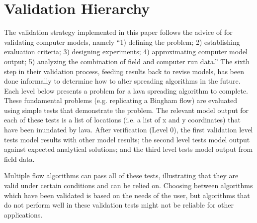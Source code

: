 			
			
			

	\section{Validation Hierarchy}\label{sec_validationb}
	
	The validation strategy implemented in this paper follows the advice of \citet{bayarri2007framework} for validating computer models, namely ``1) defining the problem; 2) establishing evaluation criteria; 3) designing experiments; 4) approximating computer model output; 5) analyzing the combination of field and computer run data.'' The sixth step in their validation process, feeding results back to revise models, has been done informally to determine how to alter spreading algorithms in the future. Each level below presents a problem for a lava spreading algorithm to complete. These fundamental problems (e.g. replicating a Bingham flow) are evaluated using simple tests that demonstrate the problem. The relevant model output for each of these tests is a list of locations (i.e. a list of x and y coordinates) that have been inundated by lava. After verification (Level 0), the first validation level tests model results with other model results; the second level tests model output against expected analytical solutions; and the third level tests model output from field data. 
	
	Multiple flow algorithms can pass all of these tests, illustrating that they are valid under certain conditions and can be relied on. Choosing between algorithms which have been validated is based on the needs of the user, but algorithms that do not perform well in these validation tests might not be reliable for other applications.

